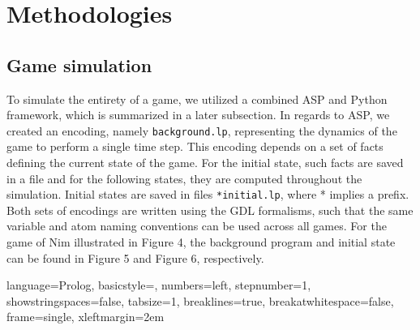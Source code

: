 \section{Methodologies}
\label{methods}
\subsection{Game simulation}

To simulate the entirety of a game, we utilized a combined ASP and Python framework, which is summarized in a later subsection. In regards to ASP, we created an encoding, namely \texttt{background.lp}, representing the dynamics of the game to perform a single time step. This encoding depends on a set of facts defining the current state of the game. For the initial state, such facts are saved in a file and for the following states, they are computed throughout the simulation. Initial states are saved in files \texttt{*initial.lp}, where * implies a prefix. Both sets of encodings are written using the GDL formalisms, such that the same variable and atom naming conventions can be used across all games. For the game of Nim illustrated in Figure 4, the background program and initial state can be found in Figure 5 and Figure 6, respectively. 

\lstset
{ %
    language=Prolog,
    basicstyle=\footnotesize,
    numbers=left,
    stepnumber=1,
    showstringspaces=false,
    tabsize=1,
    breaklines=true,
    breakatwhitespace=false,
    frame=single,
    xleftmargin=2em
}

